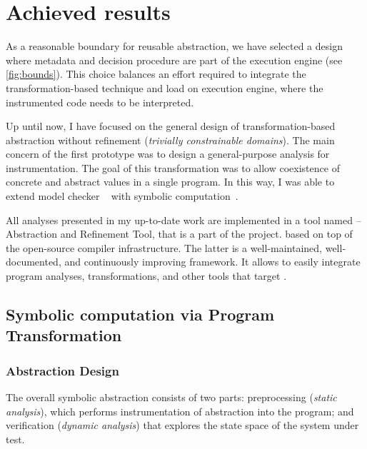\chapter{Achieved results}
\label{ch:results}



As a reasonable boundary for reusable abstraction, we have selected a design
where metadata and decision procedure are part of the execution engine (see
\autoref{fig:bounds}). This choice balances an effort required to integrate the
transformation-based technique and load on execution engine, where the
instrumented code needs to be interpreted.

Up until now, I have focused on the general design of trans\-for\-mation-based
abstraction without refinement (\emph{trivially constrainable domains}). The
main concern of the first prototype was to design a general-purpose analysis
for instrumentation. The goal of this transformation was to allow coexistence
of concrete and abstract values in a single program. In this way, I was able to
extend model checker \divine~\cite{Divine17} with symbolic
computation~\cite{Lauko2019Sym, Lauko2018SymComp}.

All analyses presented in my up-to-date work are implemented in a tool named
\lart -- \llvm Abstraction and Refinement Tool, that is a part of the \divine
project. \lart based on top of the open-source \llvm compiler infrastructure.
The latter is a well-maintained, well-documented, and continuously improving
framework. It allows \lart to easily integrate program analyses,
transformations, and other tools that target \llvm.

\section{Symbolic computation via Program Transformation}
\label{sec:symbolic}

\subsection{Abstraction Design}

The overall symbolic abstraction consists of two parts: preprocessing (\emph{static
analysis}), which performs instrumentation of abstraction into the program; and
verification (\emph{dynamic analysis}) that explores the state space of the
system under test.

